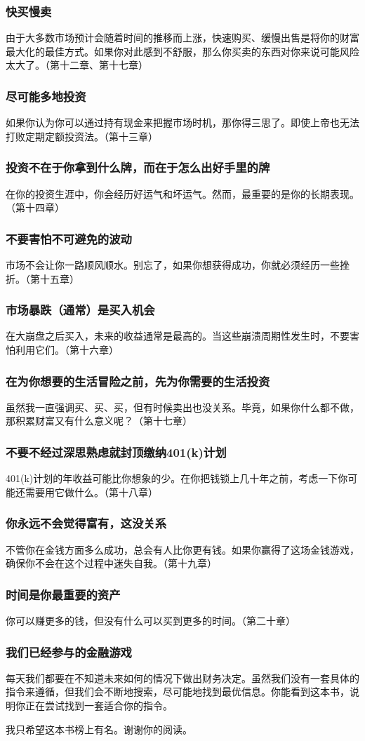 \subsubsection{快买慢卖}
由于大多数市场预计会随着时间的推移而上涨，快速购买、缓慢出售是将你的财富最大化的最佳方式。如果你对此感到不舒服，那么你买卖的东西对你来说可能风险太大了。（第十二章、第十七章）

\subsubsection{尽可能多地投资}
如果你认为你可以通过持有现金来把握市场时机，那你得三思了。即使上帝也无法打败定期定额投资法。（第十三章）

\subsubsection{投资不在于你拿到什么牌，而在于怎么出好手里的牌}
在你的投资生涯中，你会经历好运气和坏运气。然而，最重要的是你的长期表现。（第十四章）

\subsubsection{不要害怕不可避免的波动}
市场不会让你一路顺风顺水。别忘了，如果你想获得成功，你就必须经历一些挫折。（第十五章）

\subsubsection{市场暴跌（通常）是买入机会}
在大崩盘之后买入，未来的收益通常是最高的。当这些崩溃周期性发生时，不要害怕利用它们。（第十六章）

\subsubsection{在为你想要的生活冒险之前，先为你需要的生活投资}
虽然我一直强调买、买、买，但有时候卖出也没关系。毕竟，如果你什么都不做，那积累财富又有什么意义呢？（第十七章）

\subsubsection{不要不经过深思熟虑就封顶缴纳401(k)计划}
401(k)计划的年收益可能比你想象的少。在你把钱锁上几十年之前，考虑一下你可能还需要用它做什么。（第十八章）

\subsubsection{你永远不会觉得富有，这没关系}
不管你在金钱方面多么成功，总会有人比你更有钱。如果你赢得了这场金钱游戏，确保你不会在这个过程中迷失自我。（第十九章）

\subsubsection{时间是你最重要的资产}
你可以赚更多的钱，但没有什么可以买到更多的时间。（第二十章）

\subsubsection{我们已经参与的金融游戏}
每天我们都要在不知道未来如何的情况下做出财务决定。虽然我们没有一套具体的指令来遵循，但我们会不断地搜索，尽可能地找到最优信息。你能看到这本书，说明你正在尝试找到一套适合你的指令。

我只希望这本书榜上有名。谢谢你的阅读。
